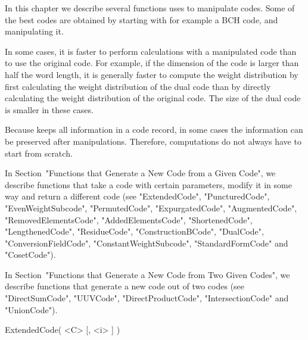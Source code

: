 %
%
%
%

In this chapter we describe several functions {\GUAVA} uses to manipulate
codes. Some of the best codes are obtained by starting with for example a
BCH code, and manipulating it.

In some  cases, it is  faster to perform  calculations with a manipulated
code than to use the original code. For  example, if the dimension of the
code  is larger than  half  the word length,  it  is generally  faster to
compute  the   weight  distribution  by  first   calculating   the weight
distribution of the  dual code than   by directly calculating  the weight
distribution of the original code.  The size of the  dual code is smaller
in these cases.

Because {\GUAVA}  keeps all information  in a code  record, in some cases
the   information can  be   preserved   after manipulations.   Therefore,
computations do not always have to start from scratch.

In Section~"Functions that Generate a New Code from  a  Given  Code",  we
describe functions that take a code with certain parameters, modify it in
some   way   and   return   a   different   code   (see   "ExtendedCode",
"PuncturedCode", "EvenWeightSubcode",  "PermutedCode",  "ExpurgatedCode",
"AugmentedCode",       "RemovedElementsCode",        "AddedElementsCode",
"ShortenedCode",  "LengthenedCode",  "ResidueCode",  "ConstructionBCode",
"DualCode",        "ConversionFieldCode",        "ConstantWeightSubcode",
"StandardFormCode" and "CosetCode").

In Section~"Functions that Generate a New Code from Two Given Codes",  we
describe functions that generate  a  new  code  out  of  two  codes  (see
"DirectSumCode", "UUVCode", "DirectProductCode",  "IntersectionCode"  and
"UnionCode").


\>ExtendedCode( <C> [, <i> ] )


